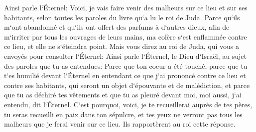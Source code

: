 \verse Ainsi parle l`Éternel: Voici, je vais faire venir des malheurs sur ce lieu et sur ses habitants, selon toutes les paroles du livre qu`a lu le roi de Juda. 
\verse Parce qu`ils m`ont abandonné et qu`ils ont offert des parfums à d`autres dieux, afin de m`irriter par tous les ouvrages de leurs mains, ma colère s`est enflammée contre ce lieu, et elle ne s`éteindra point. 
\verse Mais vous direz au roi de Juda, qui vous a envoyés pour consulter l`Éternel: Ainsi parle l`Éternel, le Dieu d`Israël, au sujet des paroles que tu as entendues: 
\verse Parce que ton coeur a été touché, parce que tu t`es humilié devant l`Éternel en entendant ce que j`ai prononcé contre ce lieu et contre ses habitants, qui seront un objet d`épouvante et de malédiction, et parce que tu as déchiré tes vêtements et que tu as pleuré devant moi, moi aussi, j`ai entendu, dit l`Éternel. 
\verse C`est pourquoi, voici, je te recueillerai auprès de tes pères, tu seras recueilli en paix dans ton sépulcre, et tes yeux ne verront pas tous les malheurs que je ferai venir sur ce lieu. Ils rapportèrent au roi cette réponse. 

\chapter{}

